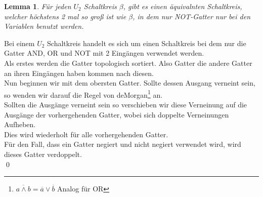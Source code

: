 \documentclass[a4paper]{article}
\newtheorem{lemma}{Lemma}
\begin{document}
\begin{lemma}
	Für jeden $U_2$ Schaltkreis $\beta$, gibt es einen äquivalnten Schaltkreis, welcher höchstens
	2 mal so groß ist wie $\beta$, in dem nur NOT-Gatter nur bei den Variablen benutzt werden.
\end{lemma}

Bei einem $U_2$ Schaltkreis handelt es sich um einen Schaltkreis bei dem nur die Gatter AND, OR und NOT mit 2 Eingängen verwendet werden.\\

Als erstes werden die Gatter topologisch sortiert. Also Gatter die andere Gatter an ihren Eingängen haben kommen nach diesen.\\
Nun beginnen wir mit dem obersten Gatter. Sollte dessen Ausgang verneint sein, so wenden wir darauf die Regel von deMorgan\footnote{$\overline{a\land{}b}=\overline{a}\lor\overline{b}$ Analog für OR} an.\\
Sollten die Ausgänge verneint sein so verschieben wir diese Verneinung auf die Ausgänge der vorhergehenden Gatter, wobei sich doppelte Verneinungen Aufheben.\\
Dies wird wiederholt für alle vorhergehenden Gatter.\\
Für den Fall, dass ein Gatter negiert und nicht negiert verwendet wird, wird dieses Gatter verdoppelt.\\
\qed{}
\end{document}
